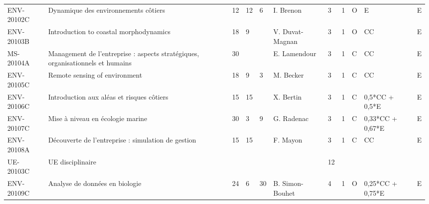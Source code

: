 \documentclass[a4paper,11pt]{article}
\begin{document}
{{\begin{tabular}{lllllllllll}
ENV-20102C                         & Dynamique des environnements côtiers                                           & 12 & 12                         & 6  & I. Brenon                          & 3    & 1    & O           & E                & E         \\
ENV-20103B                         & \cellcolor[HTML]{FD6864}Introduction to coastal morphodynamics                 & 18 & 9                          &    & V. Duvat-Magnan                    & 3    & 1    & O           & CC               & E         \\
MS-20104A                          & Management de l'entreprise : aspects stratégiques, organisationnels et humains & 30 &                            &    & E. Lamendour                       & 3    & 1    & C           & CC               & E         \\
ENV-20105C                         & \cellcolor[HTML]{FD6864}Remote sensing of environment                          & 18 & 9                          & 3  & \cellcolor[HTML]{FD6864}M. Becker  & 3    & 1    & C           & CC               & E         \\
ENV-20106C                         & Introduction aux aléas et risques côtiers                                      & 15 & 15                         &    & X. Bertin                          & 3    & 1    & C           & 0,5*CC + 0,5*E   & E         \\
ENV-20107C                         & Mise à niveau en écologie marine                                               & 30 & 3                          & 9  & G. Radenac                         & 3    & 1    & C           & 0,33*CC + 0,67*E & E         \\
ENV-20108A                         & Découverte de l'entreprise : simulation de gestion                             & 15 & 15                         &    & F. Mayon                           & 3    & 1    & C           & CC               & E         \\
\rowcolor[HTML]{EFEFEF} 
UE-20103C                          & UE disciplinaire                                                               &    &                            &    &                                    & 12   &      &             &                  &           \\
ENV-20109C                         & Analyse de données en biologie                                                 & 24 & 6                          & 30 & B. Simon-Bouhet                    & 4    & 1    & O           & 0,25*CC + 0,75*E & E         \\

\end{tabular}}}
\end{document}
